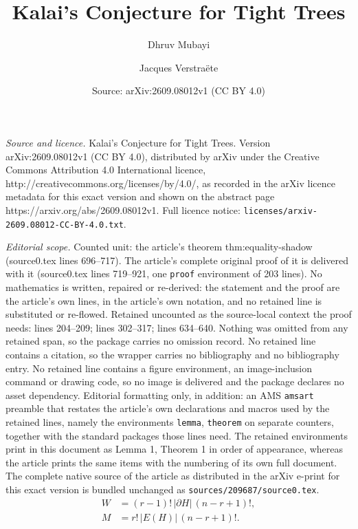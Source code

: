 \documentclass[10pt,a4paper]{amsart}
\title{Kalai's Conjecture for Tight Trees}
\author{Dhruv Mubayi \and Jacques Verstra\" ete}
\date{Source: arXiv:2609.08012v1 (CC BY 4.0)}
\newcommand{\sh}{\partial}
\begin{document}
\maketitle

\noindent\emph{Source and licence.} Kalai's Conjecture for Tight Trees. Version arXiv:2609.08012v1 (CC BY 4.0), distributed by arXiv under the Creative Commons Attribution 4.0 International licence, http://creativecommons.org/licenses/by/4.0/, as recorded in the arXiv licence metadata for this exact version and shown on the abstract page https://arxiv.org/abs/2609.08012v1. Full licence notice: \texttt{licenses/arxiv-2609.08012-CC-BY-4.0.txt}.\par\smallskip

\noindent\textit{Editorial scope.} Counted unit: the article's theorem thm:equality-shadow (source0.tex lines 696--717). The article's complete original proof of it is delivered with it (source0.tex lines 719--921, one \texttt{proof} environment of 203 lines). No mathematics is written, repaired or re-derived: the statement and the proof are the article's own lines, in the article's own notation, and no retained line is substituted or re-flowed.  Retained uncounted as the source-local context the proof needs: lines 204--209; lines 302--317; lines 634--640.  Nothing was omitted from any retained span, so the package carries no omission record.  No retained line contains a citation, so the wrapper carries no bibliography and no bibliography entry.  No retained line contains a figure environment, an image-inclusion command or drawing code, so no image is delivered and the package declares no asset dependency.  Editorial formatting only, in addition: an AMS \texttt{amsart} preamble that restates the article's own declarations and macros used by the retained lines, namely the environments \texttt{lemma}, \texttt{theorem} on separate counters, together with the standard packages those lines need.  The retained environments print in this document as Lemma 1, Theorem 1 in order of appearance, whereas the article prints the same items with the numbering of its own full document.  The complete native source of the article as distributed in the arXiv e-print for this exact version is bundled unchanged as \texttt{sources/209687/source0.tex}.
	\begin{equation}\label{eq:counts}
		\begin{aligned}
			W&=(r-1)!\,|\sh H|\,(n-r+1)!,\\
			M&=r!\,|E(H)|\,(n-r+1)!.
		\end{aligned}
	\end{equation}
\end{document}
